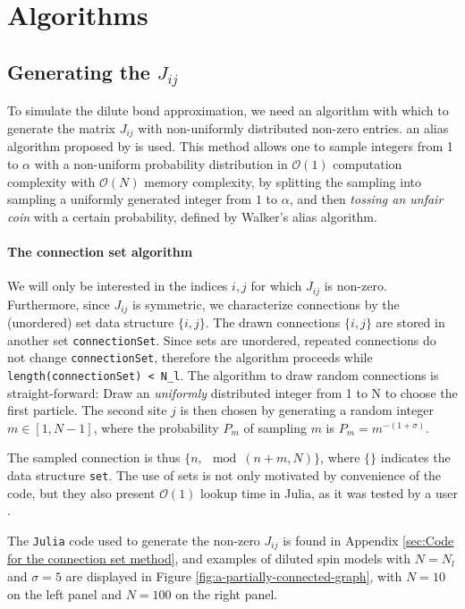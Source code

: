 \section{Algorithms}

\subsection{Generating the $J_{ij}$}

To simulate the dilute bond approximation, we need an algorithm with which to generate the matrix $J_{ij}$ with non-uniformly distributed non-zero entries.
an alias algorithm proposed by \cite{Walker1974} is used. This method allows one to sample integers from 1 to $\alpha$ with a non-uniform probability distribution in $\mathcal{O}(1)$ computation complexity with $\mathcal{O}(N)$ memory complexity, by splitting the sampling into sampling a uniformly generated integer from $1$ to  $\alpha$, and then \textit{tossing an unfair coin} with a certain probability, defined by Walker's alias algorithm.

\paragraph{The connection set algorithm}%
\label{sub:The connection set algorithm}

We will only be interested in the indices $i, j$ for which  $J_{ij}$ is non-zero. Furthermore, since $J_{ij}$ is symmetric, we characterize connections by the (unordered) set data structure $\{i, j\}$.
The drawn connections $\{ i, j \} $ are stored in another set \texttt{connectionSet}. Since sets are unordered, repeated connections do not change \texttt{connectionSet}, therefore the algorithm proceeds while \texttt{length(connectionSet) < N\_l}. The algorithm to draw random connections is straight-forward: Draw an \textit{uniformly} distributed integer from 1 to N to choose the first particle. The second site $j$ is then chosen by generating a random integer $m \in [1, N-1]$, where the probability $P_m$ of sampling $m$ is  $P_m = m^{-(1+\sigma)}$. 


The sampled connection is thus $\{n, \mod(n+m, N)\}$, where $\{\}$ indicates the data structure \texttt{set}. 
The use of sets is not only motivated by convenience of the code, but they also present $\mathcal{O}(1)$ lookup time in Julia, as it was tested by a user \cite{setTime}.

The \texttt{Julia} code used to generate the non-zero $J_{ij}$ is found in Appendix \ref{sec:Code for the connection set method}, and examples of diluted spin models with $N=N_l$ and $\sigma = 5$ are displayed in Figure \ref{fig:a-partially-connected-graph}, with $N=10$ on the left panel and $N=100$ on the right panel.


